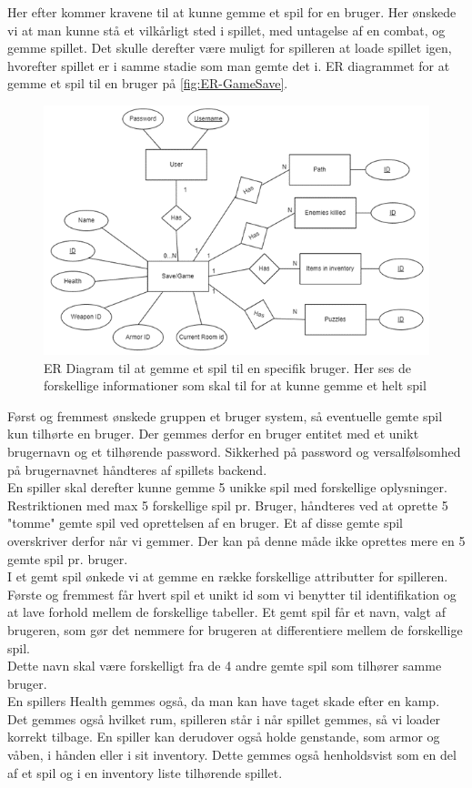 Her efter kommer kravene til at kunne gemme et spil for en bruger. Her ønskede vi at man kunne stå et vilkårligt sted i spillet, med untagelse af en combat, og gemme spillet. Det skulle derefter være muligt for spilleren at loade spillet igen, hvorefter spillet er i samme stadie som man gemte det i.
ER diagrammet for at gemme et spil til en bruger på \autoref{fig:ER-GameSave}.
\begin{figure}[H]
\centering
\includegraphics[width = \textwidth]{02-Body/Images/ER-GameSave.PNG}
\caption{ER Diagram til at gemme et spil til en specifik bruger. Her ses de forskellige informationer som skal til for at kunne gemme et helt spil}
\label{fig:ER-GameSave}
\end{figure}

Først og fremmest ønskede gruppen et bruger system, så eventuelle gemte spil kun tilhørte en bruger.
Der gemmes derfor en bruger entitet med et unikt brugernavn og et tilhørende password.
Sikkerhed på password og versalfølsomhed på brugernavnet håndteres af spillets backend.\\
En spiller skal derefter kunne gemme 5 unikke spil med forskellige oplysninger.
Restriktionen med max 5 forskellige spil pr. Bruger, håndteres ved at oprette 5 "tomme" gemte spil ved oprettelsen af en bruger.
Et af disse gemte spil overskriver derfor når vi gemmer. Der kan på denne måde ikke oprettes mere en 5 gemte spil pr. bruger.\\
I et gemt spil ønkede vi at gemme en række forskellige attributter for spilleren.
Første og fremmest får hvert spil et unikt id som vi benytter til identifikation og at lave forhold mellem de forskellige tabeller.
Et gemt spil får et navn, valgt af brugeren, som gør det nemmere for brugeren at differentiere mellem de forskellige spil. \\ Dette navn skal være forskelligt fra de 4 andre gemte spil som tilhører samme bruger.\\
En spillers Health gemmes også, da man kan have taget skade efter en kamp.\\
Det gemmes også hvilket rum, spilleren står i når spillet gemmes, så vi loader korrekt tilbage. 
En spiller kan derudover også holde genstande, som armor og våben, i hånden eller i sit inventory. Dette gemmes også henholdsvist som en del af et spil og i en inventory liste tilhørende spillet. 

